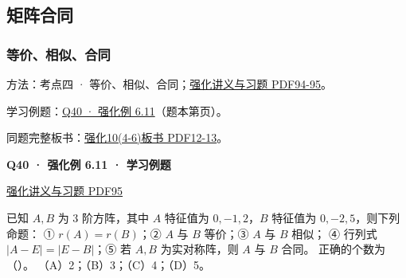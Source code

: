\documentclass[UTF8,fontset=fandol,11pt,a4paper]{ctexart}
\newcommand{\source}[1]{{\footnotesize\color{Muted}#1\par}}
\newcommand{\qtitle}[2]{\par\needspace{5\baselineskip}\hypertarget{#1}{}\label{#1}\textbf{#2}\par}
\begin{document}
\subsection*{矩阵合同}
\subsubsection*{等价、相似、合同}
\hypertarget{node-B2}{}
方法：考点四 · 等价、相似、合同；\href{file:///Users/skyintelligence/Desktop/\%E5\%BE\%97\%E8\%AF\%BB\%E4\%B8\%AA\%E7\%A0\%94-\%E5\%8C\%97\%E5\%A4\%A7\%E8\%BD\%AF\%E5\%BE\%AE/\%E6\%95\%B0\%E5\%AD\%A6\%20150/Kira\%C2\%B727\%E7\%BA\%BF\%E6\%80\%A7\%E4\%BB\%A3\%E6\%95\%B0\%E5\%BC\%BA\%E5\%8C\%96\%E8\%AE\%B2\%E4\%B9\%89\%2B\%E4\%B9\%A0\%E9\%A2\%98.pdf\#page=94}{强化讲义与习题 PDF94-95}。\par
学习例题：\hyperlink{R-EX-11}{Q40 · 强化例 6.11}（题本第\pageref*{R-EX-11}页）。\par
同题完整板书：\href{file:///Users/skyintelligence/Desktop/\%E5\%BE\%97\%E8\%AF\%BB\%E4\%B8\%AA\%E7\%A0\%94-\%E5\%8C\%97\%E5\%A4\%A7\%E8\%BD\%AF\%E5\%BE\%AE/\%E6\%95\%B0\%E5\%AD\%A6\%20150/\%E7\%BA\%BF\%E6\%80\%A7\%E4\%BB\%A3\%E6\%95\%B0/\%E7\%BA\%BF\%E4\%BB\%A3\%E5\%BC\%BA\%E5\%8C\%9610\%284-6\%29\%20\%20\%E7\%AC\%AC\%E5\%85\%AD\%E7\%AB\%A0\%20\%E4\%BA\%8C\%E6\%AC\%A1\%E5\%9E\%8B2\%E3\%80\%90\%E4\%BE\%8B6.5\%E3\%80\%91-\%E3\%80\%90\%E4\%BE\%8B6.13\%E3\%80\%91.pdf\#page=12}{强化10(4-6)板书 PDF12-13}。\par
\vspace{3mm}
\begin{minipage}{\linewidth}
\qtitle{R-EX-11}{Q40 · 强化例 6.11 · 学习例题}
\source{\href{file:///Users/skyintelligence/Desktop/\%E5\%BE\%97\%E8\%AF\%BB\%E4\%B8\%AA\%E7\%A0\%94-\%E5\%8C\%97\%E5\%A4\%A7\%E8\%BD\%AF\%E5\%BE\%AE/\%E6\%95\%B0\%E5\%AD\%A6\%20150/Kira\%C2\%B727\%E7\%BA\%BF\%E6\%80\%A7\%E4\%BB\%A3\%E6\%95\%B0\%E5\%BC\%BA\%E5\%8C\%96\%E8\%AE\%B2\%E4\%B9\%89\%2B\%E4\%B9\%A0\%E9\%A2\%98.pdf\#page=95}{强化讲义与习题 PDF95}}
已知 $A,B$ 为 3 阶方阵，其中 $A$ 特征值为 $0,-1,2$，$B$ 特征值为 $0,-2,5$，则下列命题：
① $r(A)=r(B)$；② $A$ 与 $B$ 等价；③ $A$ 与 $B$ 相似；
④ 行列式 $|A-E|=|E-B|$；⑤ 若 $A,B$ 为实对称阵，则 $A$ 与 $B$ 合同。
正确的个数为（\quad）。
（A）2；（B）3；（C）4；（D）5。
\end{minipage}\par\vspace{7mm}
\end{document}
